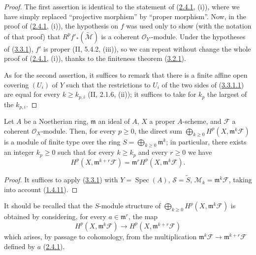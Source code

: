 \begin{proof}
The first assertion is identical to the statement of
(\hyperref[III.2.4.1]{2.4.1}, (i)), where we have simply replaced
``projective morphism'' by ``proper morphism''. Now, in the proof
of (\hyperref[III.2.4.1]{2.4.1}, (i)), the hypothesis on $f$ was used
only to show (with the notation of that proof) that
$R^pf'_*(\widetilde{\mathcal M})$ is a coherent $\mathcal O_{Y'}$-module.
Under the hypotheses of (\hyperref[III.3.3.1]{3.3.1}), $f'$ is proper
(II, 5.4.2, (iii)), so we can repeat without change the whole
proof of (\hyperref[III.2.4.1]{2.4.1}, (i)), thanks to the finiteness
theorem (\hyperref[III.3.2.1]{3.2.1}).

As for the second assertion, it suffices to remark that there is a
finite affine open covering $(U_i)$ of $Y$ such that the restrictions to
$U_i$ of the two sides of
(\hyperref[III.3.3.1.1]{3.3.1.1}) are equal for every
$k\geq k_{p,i}$ (II, 2.1.6, (ii)); it suffices to take for $k_p$ the
largest of the $k_{p,i}$.
\end{proof}

\begin{corollary}[3.3.2]
\label{III.3.3.2}
Let $A$ be a Noetherian ring, $\mathfrak m$ an ideal of $A$, $X$ a proper
$A$-scheme, and $\mathcal F$ a coherent $\mathcal O_X$-module. Then,
for every $p\geq0$, the direct sum
$\bigoplus_{k\geq0}H^p(X,\mathfrak m^k\mathcal F)$ is a module of finite type
over the ring $S=\bigoplus_{k\geq0}\mathfrak m^k$; in particular, there exists
an integer $k_p\geq0$ such that for every $k\geq k_p$ and every $r\geq0$ we have
\[
H^p(X,\mathfrak m^{k+r}\mathcal F)
=\mathfrak m^rH^p(X,\mathfrak m^k\mathcal F).
\tag{3.3.2.1}\label{III.3.3.2.1}
\]
\end{corollary}

\begin{proof}
It suffices to apply (\hyperref[III.3.3.1]{3.3.1}) with
$Y=\operatorname{Spec}(A)$, $\mathcal S=\widetilde S$,
$\mathcal M_k=\mathfrak m^k\mathcal F$, taking into account
(\hyperref[III.1.4.11]{1.4.11}).
\end{proof}

It should be recalled that the $S$-module structure of
$\bigoplus_{k\geq0}H^p(X,\mathfrak m^k\mathcal F)$ is obtained by considering,
for every $a\in\mathfrak m^r$, the map
\[
H^p(X,\mathfrak m^k\mathcal F)
\longrightarrow H^p(X,\mathfrak m^{k+r}\mathcal F)
\]
which arises, by passage to cohomology, from the multiplication
$\mathfrak m^k\mathcal F\to\mathfrak m^{k+r}\mathcal F$ defined by $a$
(\hyperref[III.2.4.1]{2.4.1}).

